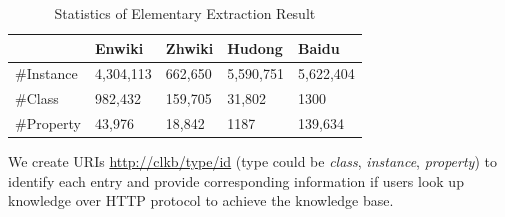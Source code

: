 \documentclass[runningheads,a4paper]{llncs}
\begin{document}
\vspace{-0.5cm}
\begin{table}[hb]
    \small
    \centering
    \caption{Statistics of Elementary Extraction Result}
    \label{tab:extract-result}
        \begin{tabular}{|p{2.5cm}|p{2cm}|p{2cm}|p{2cm}|p{2cm}|}
            \hline
                       & Enwiki    & Zhwiki   & Hudong    & Baidu     \\ \hline
            \#Instance & 4,304,113 & 662,650  & 5,590,751 & 5,622,404 \\ \hline
            \#Class    & 982,432   & 159,705  & 31,802    & 1300      \\ \hline
            \#Property & 43,976    & 18,842   & 1187      & 139,634   \\ \hline
        \end{tabular}
\end{table}
\vspace{-0.5cm}

We create URIs \url{http://clkb/type/id} (type could be \textit{class}, \textit{instance}, \textit{property}) to identify each entry and provide corresponding information if users look up knowledge over HTTP protocol to achieve the knowledge base.
\end{document}
